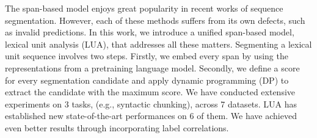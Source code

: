 The span-based model enjoys great popularity in recent works of sequence segmentation. However, each of these methods suffers from its own defects, such as invalid predictions. In this work, we introduce a unified span-based model, lexical unit analysis (LUA), that addresses all these matters. Segmenting a lexical unit sequence involves two steps. Firstly, we embed every span by using the representations from a pretraining language model. Secondly, we define a score for every segmentation candidate and apply dynamic programming (DP) to extract the candidate with the maximum score. We have conducted extensive experiments on 3 tasks, (e.g., syntactic chunking), across 7 datasets. LUA has established new state-of-the-art performances on 6 of them. We have achieved even better results through incorporating label correlations.
